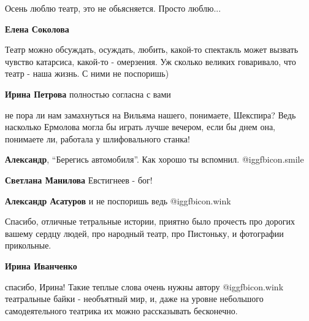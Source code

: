  
 
 
 
 
\zzSecCmt

\begin{itemize} %
Осень люблю театр, это не обьясняется. Просто люблю...

\begin{itemize} %
\textbf{Елена Соколова} 

Театр можно обсуждать, осуждать, любить, какой-то спектакль может вызвать
чувство катарсиса, какой-то - омерзения. Уж сколько великих говаривало, что
театр - наша жизнь. С ними не поспоришь)

\textbf{Ирина Петрова} полностью согласна с вами
\end{itemize} %


не пора ли нам замахнуться на Вильяма нашего, понимаете, Шекспира? Ведь
насколько Ермолова могла бы играть лучше вечером, если бы днем она, понимаете
ли, работала у шлифовального станка!

\begin{itemize} %
\textbf{Александр}, \enquote{Берегись автомобиля}. Как хорошо ты вспомнил. @igg{fbicon.smile} 

\textbf{Светлана Манилова} Евстигнеев - бог!

\textbf{Александр Асатуров} и не поспоришь ведь @igg{fbicon.wink} 
\end{itemize} %


Спасибо, отличные тетральные истории, приятно было прочесть про дорогих вашему
сердцу людей, про народный театр, про Пистоньку, и фотографии прикольные.

\textbf{Ирина Иванченко} 

спасибо, Ирина! Такие теплые слова очень нужны автору @igg{fbicon.wink}  театральные байки -
необъятный мир, и, даже на уровне небольшого самодеятельного театрика их можно
рассказывать бесконечно.


\end{itemize}
